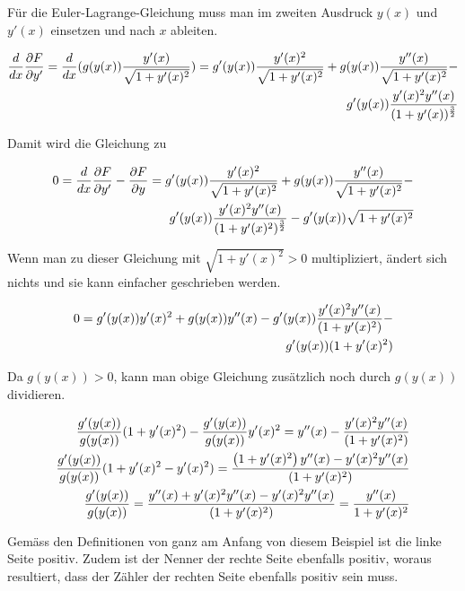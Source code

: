 Für die Euler-Lagrange-Gleichung muss man im zweiten Ausdruck $y(x)$ 
und $y'(x)$ einsetzen und nach $x$ ableiten.

\begin{align}
\frac{d}{dx} \frac{\partial F}{\partial y'} = \frac{d}{dx} (g(y(x)) \frac{y'(x)}{\sqrt{1 + y'(x)^2}})
 = g'(y(x)) \frac{y'(x)^2}{\sqrt{1 + y'(x)^2}} + g(y(x)) \frac{y''(x)}{\sqrt{1 + y'(x)^2}} - \notag \\
g'(y(x)) \frac{y'(x)^2 y''(x)}{(1 + y'(x))^\frac{3}{2}}
\end{align}

Damit wird die Gleichung zu

\begin{align}
0 = \frac{d}{dx} \frac{\partial F}{\partial y'} - \frac{\partial F}{\partial y} = 
g'(y(x)) \frac{y'(x)^2}{\sqrt{1 + y'(x)^2}} + g(y(x)) \frac{y''(x)}{\sqrt{1 + y'(x)^2}} - \notag \\
g'(y(x)) \frac{y'(x)^2 y''(x)}{(1 + y'(x)^2)^\frac{3}{2}}  - g'(y(x)) \sqrt{1 + y'(x)^2}
\end{align}

Wenn man zu dieser Gleichung mit $\sqrt{1 + y'(x)^2} > 0$ multipliziert, 
ändert sich nichts und sie kann einfacher geschrieben werden.

\begin{align}
0 = g'(y(x)) y'(x)^2 + g(y(x)) y''(x) - g'(y(x)) \frac{y'(x)^2 y''(x)}{(1 + y'(x)^2)} - \notag \\ g'(y(x)) (1 + y'(x)^2)
\end{align}

Da $g(y(x)) > 0$, kann man obige Gleichung zusätzlich noch durch $g(y(x))$ dividieren.

\begin{align}
\frac{g'(y(x))}{g(y(x))} (1 + y'(x)^2) - \frac{g'(y(x))}{g(y(x))} y'(x)^2 =  y''(x) - \frac{y'(x)^2 y''(x)}{(1 + y'(x)^2)} \notag \\
\frac{g'(y(x))}{g(y(x))} (1 + y'(x)^2 - y'(x)^2) = \frac{\left(1 + y'(x)^2 \right)y''(x) - y'(x)^2 y''(x)}{(1 + y'(x)^2)} \notag \\
\frac{g'(y(x))}{g(y(x))} = \frac{y''(x) + y'(x)^2 y''(x) - y'(x)^2 y''(x)}{(1 + y'(x)^2)} = \frac{y''(x)}{1 + y'(x)^2}
\end{align}

Gemäss den Definitionen von ganz am Anfang von diesem Beispiel ist die linke Seite positiv. 
Zudem ist der Nenner der rechte Seite ebenfalls positiv, woraus resultiert, dass der Zähler 
der rechten Seite ebenfalls positiv sein muss.

